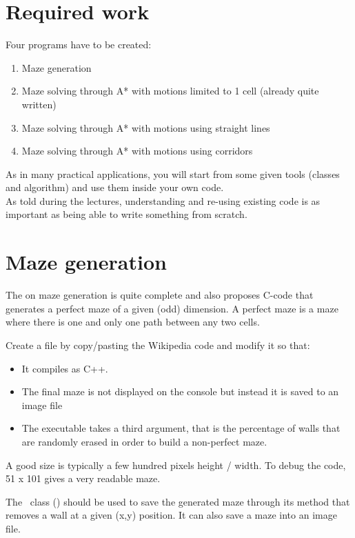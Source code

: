 \documentclass{ecnreport}
\def\maze{\okt{ecn::Maze}~}
\begin{document}
\section{Required work}

Four programs have to be created: 
\begin{enumerate}
 \item Maze generation
 \item Maze solving through A* with motions limited to 1 cell (already quite written)
 \item Maze solving through A* with motions using straight lines
 \item Maze solving through A* with motions using corridors
\end{enumerate}

As in many practical applications, you will start from some given tools (classes and algorithm) and use them inside your own code.\\
As told during the lectures, understanding and re-using existing code is as important as being able to write something from scratch.

\section{Maze generation}

The  on maze generation is quite complete
and also proposes C-code that generates a perfect maze of a given (odd) dimension. A perfect maze is a maze where there is one and only 
one path between any two cells.

Create a  file by copy/pasting the Wikipedia code and modify it so that:
\begin{itemize}
 \item It compiles as C++.
 \item The final maze is not displayed on the console but instead it is saved to an image file 
 \item The executable takes a third argument, that is the percentage of walls that are randomly erased in order to build a non-perfect maze.
\end{itemize}
A good size is typically a few hundred pixels height / width. To debug the code, 51 x 101 gives a very readable maze.

The \maze class () should be used to save the generated maze through its  method that removes a wall at a given (x,y) position.
It can also save a maze into an image file.
\end{document}
